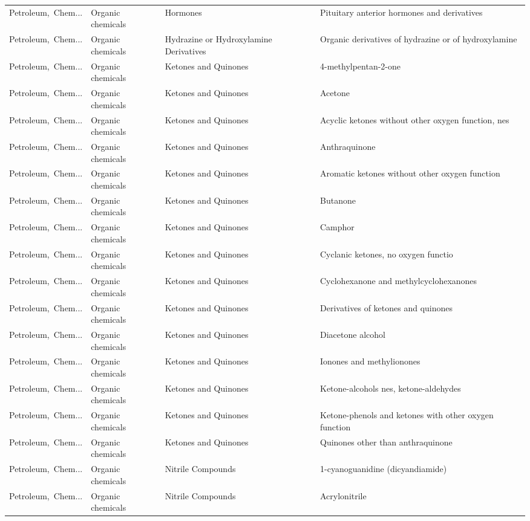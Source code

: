 \begin{appendices}
\begin{xltabular}{\textwidth}{|p{0.10\textwidth}|p{0.25\textwidth}|p{0.24\textwidth}|p{0.31\textwidth}|}
Petroleum,\ Chem... & Organic chemicals & Hormones & Pituitary anterior hormones and derivatives \\
Petroleum,\ Chem... & Organic chemicals & Hydrazine or Hydroxylamine Derivatives & Organic derivatives of hydrazine or of hydroxylamine \\
Petroleum,\ Chem... & Organic chemicals & Ketones and Quinones & 4-methylpentan-2-one \\
Petroleum,\ Chem... & Organic chemicals & Ketones and Quinones & Acetone \\
Petroleum,\ Chem... & Organic chemicals & Ketones and Quinones & Acyclic ketones without other oxygen function, nes \\
Petroleum,\ Chem... & Organic chemicals & Ketones and Quinones & Anthraquinone \\
Petroleum,\ Chem... & Organic chemicals & Ketones and Quinones & Aromatic ketones without other oxygen function \\
Petroleum,\ Chem... & Organic chemicals & Ketones and Quinones & Butanone \\
Petroleum,\ Chem... & Organic chemicals & Ketones and Quinones & Camphor \\
Petroleum,\ Chem... & Organic chemicals & Ketones and Quinones & Cyclanic ketones, no oxygen functio \\
Petroleum,\ Chem... & Organic chemicals & Ketones and Quinones & Cyclohexanone and methylcyclohexanones \\
Petroleum,\ Chem... & Organic chemicals & Ketones and Quinones & Derivatives of ketones and quinones \\
Petroleum,\ Chem... & Organic chemicals & Ketones and Quinones & Diacetone alcohol \\
Petroleum,\ Chem... & Organic chemicals & Ketones and Quinones & Ionones and methylionones \\
Petroleum,\ Chem... & Organic chemicals & Ketones and Quinones & Ketone-alcohols nes, ketone-aldehydes \\
Petroleum,\ Chem... & Organic chemicals & Ketones and Quinones & Ketone-phenols and ketones with other oxygen function \\
Petroleum,\ Chem... & Organic chemicals & Ketones and Quinones & Quinones other than anthraquinone \\
Petroleum,\ Chem... & Organic chemicals & Nitrile Compounds & 1-cyanoguanidine (dicyandiamide) \\
Petroleum,\ Chem... & Organic chemicals & Nitrile Compounds & Acrylonitrile \\

\end{xltabular}
\end{appendices}
